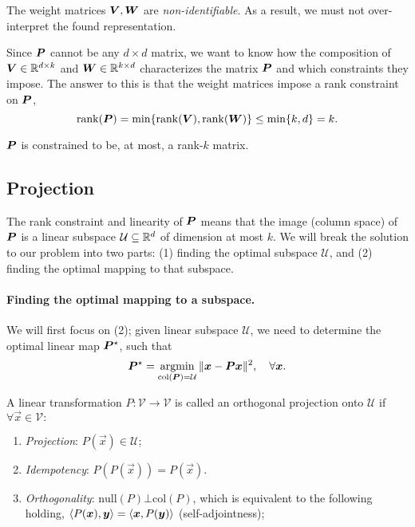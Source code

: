 \begin{important}
    The weight matrices $\bm{V}, \bm{W}$ are \textit{non-identifiable}. As a result, we must not over-interpret the found representation.
\end{important}

Since $\bm{P}$ cannot be any $d\times d$ matrix, we want to know how the composition of $\bm{V}
    \in \mathbb{R}^{d\times k}$ and $\bm{W} \in \mathbb{R}^{k\times d}$ characterizes the matrix $\bm{P}$ and which
constraints they impose. The answer to this is that the weight matrices impose a rank constraint on
$\bm{P}$, \[
    \mathrm{rank}(\bm{P}) = \min \{ \mathrm{rank}(\bm{V}), \mathrm{rank}(\bm{W}) \} \leq \min \{ k, d \} = k.
\]

\begin{important}
    $\bm{P}$ is constrained to be, at most, a rank-$k$ matrix.
\end{important}

\subsection{Projection}

The rank constraint and linearity of $\bm{P}$ means that the image (column space) of $\bm{P}$ is
a linear subspace $\mathcal{U} \subseteq \mathbb{R}^d$ of dimension at most $k$. We will break the solution
to our problem into two parts: (1) finding the optimal subspace $\mathcal{U}$, and (2) finding the
optimal mapping to that subspace.

\paragraph{Finding the optimal mapping to a subspace.}

We will first focus on (2); given linear subspace $\mathcal{U}$, we need to determine the optimal
linear map $\bm{P}^\star$, such that \[
    \bm{P}^\star = \operatorname*{argmin}_{\mathrm{col}(\bm{P}) = \mathcal{U}} \| \bm{x} - \bm{P}\bm{x} \|^2, \quad \forall \bm{x}.
\]

\begin{definition}
    \label{def:orthogonal-projection}

    A linear transformation $P: \mathcal{V} \to \mathcal{V}$ is called an orthogonal projection onto
    $\mathcal{U}$ if $\forall \vec{x}\in \mathcal{V}:$
    \begin{enumerate}
        \item \textit{Projection}: $P(\vec{x}) \in \mathcal{U}$;
        \item \textit{Idempotency}: $P(P(\vec{x})) = P(\vec{x})$.
        \item \textit{Orthogonality}: $\mathrm{null}(P) \bot \mathrm{col}(P)$, which is equivalent to
              the following holding, $\langle P(\bm{x}), \bm{y} \rangle = \langle \bm{x},P(\bm{y}) \rangle$ (self-adjointness);
    \end{enumerate}
\end{definition}

